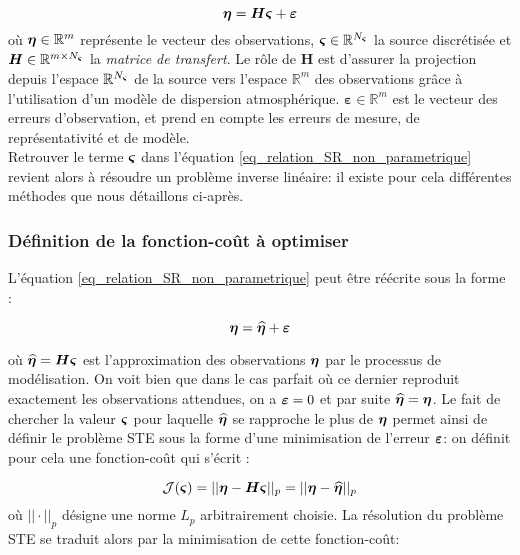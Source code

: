 \begin{equation}
	\label{eq_relation_SR_non_parametrique}
	{\bm{\eta}} = \bm{H}{\bm{\varsigma}} + \bm{\varepsilon}
\end{equation}
où ${\bm{\eta}} \in \mathbb{R}^m$ représente le vecteur des observations, ${\bm{\varsigma}} \in \mathbb{R}^{N_{\bm{\varsigma}}}$ la source discrétisée et $\bm{H} \in \mathbb{R}^{m \times N_{\bm{\varsigma}}}$  la \textit{matrice de transfert}. Le rôle de $\bm{H}$ est d'assurer la projection depuis l'espace $\mathbb{R}^{N_{\bm{\varsigma}}}$  de la source vers l'espace $\mathbb{R}^m$ des observations grâce à l'utilisation d'un modèle de dispersion atmosphérique. $\bm{\varepsilon} \in \mathbb{R}^m$ est le vecteur des erreurs d'observation, et prend en compte les erreurs de mesure, de représentativité et de modèle. \\

Retrouver le terme ${\bm{\varsigma}}$ dans l'équation \eqref{eq_relation_SR_non_parametrique} revient alors à résoudre un problème inverse linéaire: il existe pour cela différentes méthodes que nous détaillons ci-après.

\subsubsection{Définition de la fonction-coût à optimiser}

L'équation \eqref{eq_relation_SR_non_parametrique} peut être réécrite sous la forme : 
 
 \begin{equation}
 {\bm{\eta}} = \widehat{{\bm{\eta}}} + {\bm{\varepsilon}}
 \label{eq_relation_SR_nonparam_simple}
 \end{equation}

où $\widehat{{\bm{\eta}}} = {\bm{H}} {\bm{\varsigma}}$ est l'approximation des observations ${\bm{\eta}}$ par le processus de modélisation. On voit bien que dans le cas parfait où ce dernier reproduit exactement les observations attendues, on a ${\bm{\varepsilon}} = 0$ et par suite $\widehat{{\bm{\eta}}} = {\bm{\eta}}$. Le fait de chercher la valeur ${\bm{\varsigma}}$ pour laquelle $\widehat{{\bm{\eta}}}$ se rapproche le plus de ${\bm{\eta}}$ permet ainsi de définir le problème STE sous la forme d'une minimisation de l'erreur ${\bm{\varepsilon}}$: on définit pour cela une fonction-coût qui s'écrit : 

\begin{equation}
{\mathcal{J}}({\bm{\varsigma}}) = ||{\bm{\eta}} - {\bm{H}} {\bm{\varsigma}}||_p = ||{\bm{\eta}}- \widehat{{\bm{\eta}}}||_p
\label{eq_cost_function_definition}
\end{equation}
où $||\cdot||_p$ désigne une norme $L_p$ arbitrairement choisie. La résolution du problème STE se traduit alors par la minimisation de cette fonction-coût:

